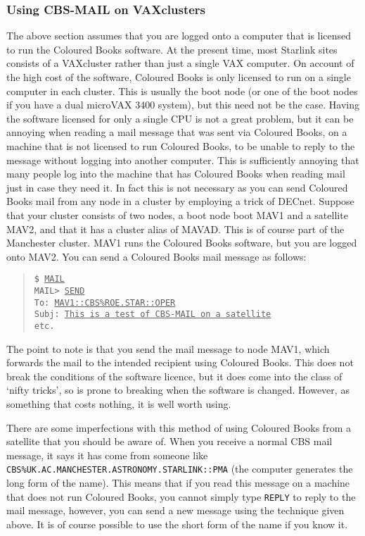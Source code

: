 \subsubsection{Using CBS-MAIL on VAXclusters}

The above section assumes that you are logged onto a computer that is licensed
to run the Coloured Books software. At the present time, most Starlink sites
consists of a VAXcluster rather than just a single VAX computer. On account of
the high cost of the software, Coloured Books is only licensed to run on a
single computer in each cluster. This is usually the boot node (or one of the
boot nodes if you have a dual microVAX 3400 system), but this need not be the
case. Having the software licensed for only a single CPU is not a great
problem, but it can be annoying when reading a mail message that was sent via
Coloured Books, on a machine that is not licensed to run Coloured Books, to be
unable to reply to the message without logging into another computer. This is
sufficiently annoying that many people log into  the machine that has Coloured
Books when reading mail just in case they need it. In fact this is not
necessary as you can send Coloured Books mail from any node in a cluster by
employing a trick of DECnet. Suppose that your cluster consists of two nodes, a
boot node boot MAV1 and a satellite MAV2, and that it has a cluster alias of
MAVAD. This is of course part of the Manchester cluster. MAV1 runs the Coloured
Books software, but you are logged onto MAV2. You can send a Coloured Books
mail message as follows:

\begin{quote}
{\tt \$ \underline{MAIL}\\[\medskipamount]
MAIL> \underline{SEND}\\
To:     \underline{MAV1::CBS\%ROE.STAR::OPER}\\
Subj:   \underline{This is a test of CBS-MAIL on a satellite}\\[\medskipamount]
etc.\\}
\end{quote}

The point to note is that you send the mail message to node MAV1, which
forwards the mail to the intended recipient using Coloured Books. This does not
break the conditions of the software licence, but it does come into the class
of `nifty tricks', so is prone to breaking when the software is changed.
However, as something that costs nothing, it is well worth using.

There are some imperfections with this method of using Coloured Books from a
satellite that you should be aware of. When you receive a normal CBS mail
message, it says it has come from someone like {\tt
CBS\%UK.AC.\-MANCHESTER.\-ASTRONOMY.\-STARLINK::PMA} (the computer generates
the long form of the name). This means that if you read this message on a
machine that does not run Coloured Books, you cannot simply type {\tt REPLY} to
reply to the mail message, however, you can send a new message using the
technique given above. It is of course possible to use the short form of the
name if you know it.

